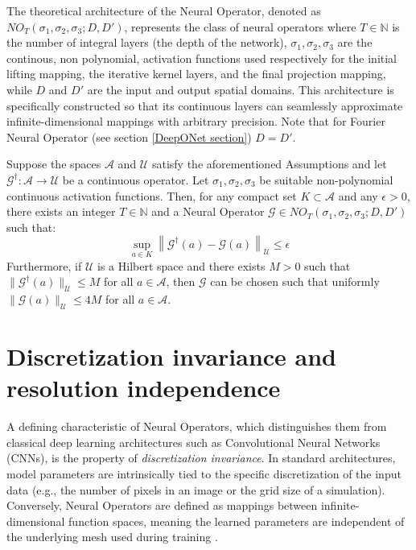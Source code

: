 The theoretical architecture of the Neural Operator, denoted as $NO_T(\sigma_1, \sigma_2, \sigma_3; D, D')$, represents the class of neural operators where $T \in \mathbb{N}$ is the number of integral layers (the depth of the network), $\sigma_1, \sigma_2, \sigma_3$ are the continous, non polynomial, activation functions used respectively for the initial lifting mapping, the iterative kernel layers, and the final projection mapping, while $D$ and $D'$ are the input and output spatial domains. This architecture is specifically constructed so that its continuous layers can seamlessly approximate infinite-dimensional mappings with arbitrary precision. Note that for Fourier Neural Operator (see section \ref{DeepONet section}) $D=D'$.

\begin{theorem}
Suppose the spaces $\mathcal{A}$ and $\mathcal{U}$ satisfy the aforementioned Assumptions and let $\mathcal{G}^{\dagger} : \mathcal{A} \to \mathcal{U}$ be a continuous operator. Let $\sigma_1, \sigma_2, \sigma_3$ be suitable non-polynomial continuous activation functions. 
Then, for any compact set $K \subset \mathcal{A}$ and any $\epsilon > 0$, there exists an integer $T \in \mathbb{N}$ and a Neural Operator $\mathcal{G} \in NO_T(\sigma_1, \sigma_2, \sigma_3; D, D')$ such that:
\[ 
\sup_{a \in K} \left\| \mathcal{G}^{\dagger}(a) - \mathcal{G}(a) \right\|_{\mathcal{U}} \le \epsilon 
\]
Furthermore, if $\mathcal{U}$ is a Hilbert space and there exists $M > 0$ such that $\|\mathcal{G}^{\dagger}(a)\|_{\mathcal{U}} \le M$ for all $a \in \mathcal{A}$, then $\mathcal{G}$ can be chosen such that uniformly $\|\mathcal{G}(a)\|_{\mathcal{U}} \le 4M$ for all $a \in \mathcal{A}$.
\end{theorem}

\newpage
\section{Discretization invariance and resolution independence}

A defining characteristic of Neural Operators, which distinguishes them from classical deep learning architectures such as Convolutional Neural Networks (CNNs), is the property of \textit{discretization invariance}. In standard architectures, model parameters are intrinsically tied to the specific discretization of the input data (e.g., the number of pixels in an image or the grid size of a simulation). Conversely, Neural Operators are defined as mappings between infinite-dimensional function spaces, meaning the learned parameters are independent of the underlying mesh used during training \cite{kovachki2023neural}.


